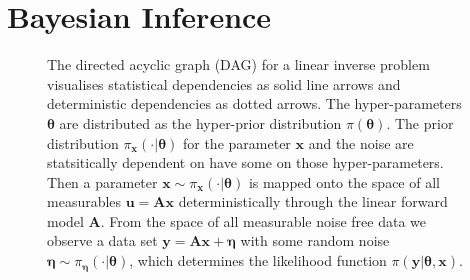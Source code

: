 \section{Bayesian Inference}
\label{sec:bayes}
\begin{figure}[ht!]
	\centering
	\caption[Bayesian Inference DAG]{The directed acyclic graph (DAG) for a linear inverse problem visualises statistical dependencies as solid line arrows and deterministic dependencies as dotted arrows.
	The hyper-parameters $\bm{\theta}$ are distributed as the hyper-prior distribution $\pi(\bm{\theta})$.
	The prior distribution $ \pi_{\bm{x}}(\cdot|\bm{\theta})$ for the parameter $\bm{x}$ and the noise are statsitically dependent on have some on those hyper-parameters.
	 Then a parameter $\bm{x} \sim \pi_{\bm{x}}(\cdot|\bm{\theta})$ is mapped onto the space of all measurables $\bm{u}=\bm{Ax}$ deterministically through the linear forward model $\bm{A}$.
	From the space of all measurable noise free data we observe a data set $\bm{y} = \bm{Ax} + \bm{\eta}$ with some random noise $ \bm{\eta} \sim \pi_{\bm{\eta}}(\cdot|\bm{\theta})$, which determines the likelihood function $\pi(\bm{y}|\bm{\theta}, \bm{x})$. }
	\label{fig:FirstDAG}
\end{figure}

